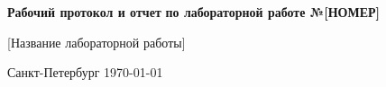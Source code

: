 \documentclass[12pt, a4paper]{article}%
\begin{document}
\begin{titlepage}
		\vspace{6em}

		\begin{center}
			\Large \textbf{Рабочий протокол и отчет} \linebreak
			\textbf{по лабораторной работе №[НОМЕР]}
		\end{center}

		\vspace{0.02em}

		\begin{center}
			\large
			[Название лабораторной работы]
		\end{center}



		\vspace{\fill}

		\begin{center}
			Санкт-Петербург \yeardate \today
		\end{center}
	\end{titlepage}
\end{document}
